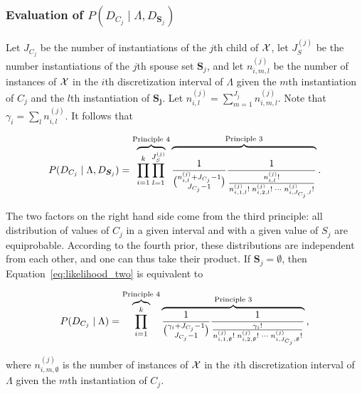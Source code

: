 \subsubsection{Evaluation of $P(D_{C_j} \mid \Lambda, D_{\bm{S}_j})$}
Let $J_{C_j}$ be the number of instantiations of the $j$th child of $\mathcal{X}$, let $J_S^{(j)}$ be the number instantiations of the $j$th spouse set $\bm{S}_j$, and let $n^{(j)}_{i,m,l}$ be the number of instances of $\mathcal{X}$ in the $i$th discretization interval of $\Lambda$ given the $m$th instantiation of $C_j$ and the $l$th instantiation of $\boldsymbol{S_j}$.
Let ${n^{(j)}_{i,l} = \sum_{m=1}^{J_j} n^{(j)}_{i,m,l}}$.
Note that ${\gamma_i = \sum_l n^{(j)}_{i,l}}$.
It follows that

\begin{equation}
  \label{eq:likelihood_two}
  P(D_{C_j} \mid \Lambda, D_{\bm{S}_j}) =
  \overbrace{\prod_{i=1}^{k} \prod_{l=1}^{J_S^{(j)}}}^{\text{Principle 4}}
    \overbrace{\rule{0pt}{2.3em}
      {
        \frac{1}{
          {{n^{(j)}_{i,l} + J_{C_j} - 1}\choose{J_{C_j}-1}}}
        }
        {\frac{
          1
        }{
          \frac{
            {n^{(j)}_{i,l}}!
          }{
            {n^{(j)}_{i,1,l}!} \; {n^{(j)}_{i,2,l}!} \; \cdots \; {n^{(j)}_{i,J_{C_j},l}!}
          }
        }
      }
    }^{\text{Principle 3}}
    \text{.}
\end{equation}

The two factors on the right hand side come from the third principle: all distribution of values of $C_j$ in a given interval and with a given value of $S_j$ are equiprobable.
According to the fourth prior, these distributions are independent from each other, and one can thus take their product.
If $\bm{S}_j = \emptyset$, then Equation~\ref{eq:likelihood_two} is equivalent to

\begin{equation}
  \label{eq:likelihood_three}
  P(D_{C_j} \mid \Lambda) = 
  \overbrace{\prod_{i=1}^{k}}^{\text{Principle 4}}
  \overbrace{{
    {1}\over{
      {\gamma_i + J_{C_j} - 1}\choose{J_{C_j}-1}}
    }
    {{1}\over{
      {{\gamma_i}!} \over {
        {n^{(j)}_{i,1,\emptyset}!} \; {n^{(j)}_{i,2,\emptyset}!} \; \cdots \; {n^{(j)}_{i,J_{C_j},\emptyset} !}
      }
    }
  }}^{\text{Principle 3}}
  \text{,}
\end{equation}

\noindent
where $n^{(j)}_{i,m,\emptyset}$ is the number of instances of $\mathcal{X}$ in the $i$th discretization interval of $\Lambda$ given the $m$th instantiation of $C_j$.

